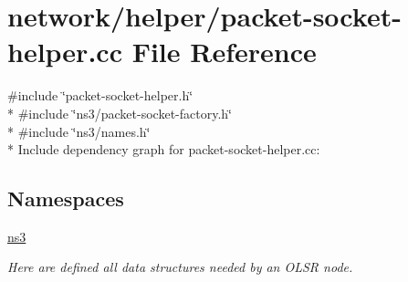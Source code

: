 \hypertarget{packet-socket-helper_8cc}{}\section{network/helper/packet-\/socket-\/helper.cc File Reference}
\label{packet-socket-helper_8cc}
{\ttfamily \#include \char`\"{}packet-\/socket-\/helper.\+h\char`\"{}}\\*
{\ttfamily \#include \char`\"{}ns3/packet-\/socket-\/factory.\+h\char`\"{}}\\*
{\ttfamily \#include \char`\"{}ns3/names.\+h\char`\"{}}\\*
Include dependency graph for packet-\/socket-\/helper.cc\+:
\subsection*{Namespaces}
\begin{DoxyCompactItemize}
\item 
 \hyperlink{namespacens3}{ns3}
\begin{DoxyCompactList}\small\item\em Here are defined all data structures needed by an O\+L\+SR node. \end{DoxyCompactList}\end{DoxyCompactItemize}
